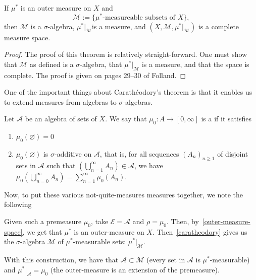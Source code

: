 \documentclass[11pt,leqno,oneside]{amsbook}
\numberwithin{thm}{section}
\renewcommand{\A}{\mathcal{A}}
\newcommand{\M}{\mathcal{M}}
\newcommand{\Ep}{\mathcal{E}}
\newcommand{\s}{$\sigma$-} %
\renewcommand{\emptyset}{\varnothing}
\begin{document}
\begin{thm}[Carathéodory]\label{caratheodory}
  If $\mu^*$ is an outer measure on $X$ and \[
    \M := \{\mu^*\text{-measureable subsets of }X\},
  \]
  then $\M$ is a \s algebra, $\mu^*|_\M$is a measure, and
  $(X,\M,\mu^*|_\M)$ is a complete measure space.
\end{thm}
\begin{proof}
  The proof of this theorem is relatively straight-forward. One must
  show that $\M$ as defined is a \s algebra, that $\mu^*|_\M$ is
  a measure, and that the space is complete. The proof is given on
  pages 29--30 of Folland.
\end{proof}
One of the important things about Carathéodory's theorem is that it
enables us to extend measures from algebras to \s algebras.
\begin{defn}
  Let $\A$ be an algebra of sets of $X$. We say that $\mu_0 \colon A \to
  [0,\infty]$ is a  if it satisfies
  \begin{enumerate}
  \item $\mu_0(\emptyset) = 0$
  \item $\mu_0(\emptyset)$ is \s additive on $\A$, that is, for
    all sequences $(A_n)_{n \geq 1}$ of disjoint sets in $\A$ such
    that $\left(\bigcup_{n=1}^\infty A_n\right) \in \A$, we have $\mu_0\left(
      \bigcup_{n=0}^\infty A_n \right) = \sum_{n=1}^\infty
    \mu_0(A_n)$.
  \end{enumerate}
\end{defn}
Now, to put these various not-quite-measures measures together, we
note the following
\begin{rmk}
  Given such a premeasure $\mu_0$, take $\Ep = \A$ and $\rho =
  \mu_0$. Then, by~\ref{outer-measure-space}, we get that $\mu^*$ is
  an outer-measure on $X$. Then~\ref{caratheodory} gives us the \s algebra $\M$
  of $\mu^*$-measurable sets: $\mu^*|_\M$.
\end{rmk}
\begin{thm}\label{premeas-extension}
  With this construction, we have that $\A \subset \M$ (every set in $\A$ is $\mu^*$-measurable) and $\mu^*|_\A
  = \mu_0$ (the outer-measure is an extension of the premeasure).
\end{thm}
\end{document}
